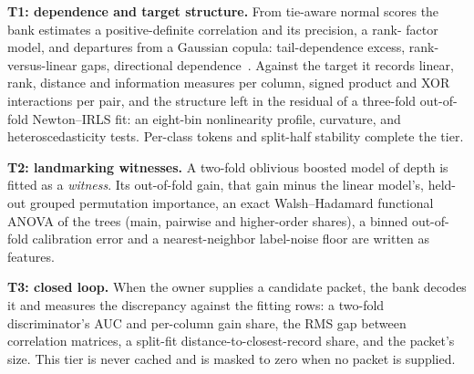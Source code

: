 \documentclass[10pt,letterpaper,twocolumn]{article}
\newcommand{\runin}[1]{\par\smallskip\noindent\textbf{#1.}\hspace{0.45em}\ignorespaces}
\begin{document}
\runin{T1: dependence and target structure} From tie-aware normal scores the bank estimates a positive-definite correlation and its precision, a rank- factor model, and departures from a Gaussian copula: tail-dependence excess, rank-versus-linear gaps, directional dependence~\cite{chatterjee2021xi}. Against the target it records linear, rank, distance and information measures per column, signed product and XOR interactions per pair, and the structure left in the residual of a three-fold out-of-fold Newton--IRLS fit: an eight-bin nonlinearity profile, curvature, and heteroscedasticity tests. Per-class tokens and split-half stability complete the tier.

\runin{T2: landmarking witnesses} A two-fold oblivious boosted model of depth  is fitted as a \emph{witness}. Its out-of-fold gain, that gain minus the linear model's, held-out grouped permutation importance, an exact Walsh--Hadamard functional ANOVA of the trees (main, pairwise and higher-order shares), a binned out-of-fold calibration error and a nearest-neighbor label-noise floor are written as features.

\runin{T3: closed loop} When the owner supplies a candidate packet, the bank decodes it and measures the discrepancy against the fitting rows: a two-fold discriminator's AUC and per-column gain share, the RMS gap between correlation matrices, a split-fit distance-to-closest-record share, and the packet's size. This tier is never cached and is masked to zero when no packet is supplied.
\end{document}

